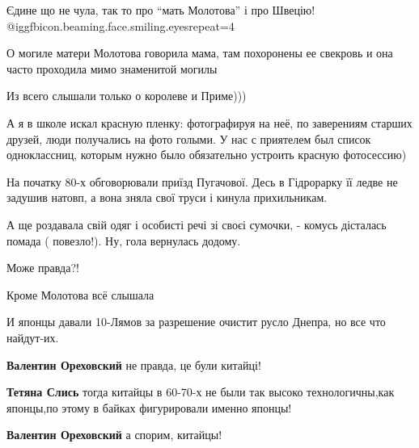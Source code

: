  
 
 
 
 
\zzSecCmt

\begin{itemize} %

Єдине що не чула, так то про \enquote{мать Молотова} і про Швецію!
@igg{fbicon.beaming.face.smiling.eyes}{repeat=4} 


О могиле матери Молотова говорила мама, там похоронены ее свекровь и она часто
проходила мимо знаменитой могилы


Из всего слышали только о королеве и Приме)))


А я в школе искал красную пленку: фотографируя на неё, по заверениям старших
друзей, люди получались на фото голыми. У нас с приятелем был список
одноклассниц, которым нужно было обязательно устроить красную фотосессию)


На початку 80-х обговорювали приїзд Пугачової. Десь в Гідрорарку її ледве не
задушив натовп, а вона зняла свої труси і кинула прихильникам.

А ще роздавала свій одяг і особисті речі зі своєі сумочки, - комусь дісталась
помада ( повезло!). Ну, гола вернулась додому.

Може правда?!


Кроме Молотова всё слышала

И японцы давали 10-Лямов за разрешение очистит русло Днепра, но все что
найдут-их.

\begin{itemize} %
\textbf{Валентин Ореховский} не правда, це були китайці!

\textbf{Тетяна Слись} тогда китайцы в 60-70-х не были так высоко технологичны,как японцы,по этому в байках фигурировали именно японцы!

\textbf{Валентин Ореховский} а спорим, китайцы!


\end{itemize}
\end{itemize}
